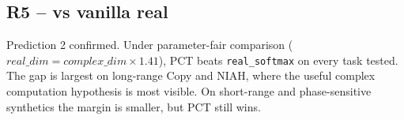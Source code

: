 \documentclass[11pt,a4paper]{article}
\theoremstyle{plain}
\theoremstyle{definition}
\begin{document}
\subsection{R5 -- vs vanilla real}
\noindent
\begin{minipage}[t]{0.47\textwidth}
\vspace{0pt}
\raggedright
\sloppy
Prediction 2 confirmed. Under parameter-fair comparison ($real\_dim = complex\_dim \times 1.41$), PCT beats \texttt{real\_softmax} on every task tested. The gap is largest on long-range Copy and NIAH, where the useful complex computation hypothesis is most visible. On short-range and phase-sensitive synthetics the margin is smaller, but PCT still wins.
\end{minipage}\hfill
\begin{minipage}[t]{0.30\textwidth}
\vspace{0pt}
\centering
{\fontsize{5.6}{6.4}\selectfont
\setlength{\tabcolsep}{1.4pt}
\renewcommand{\arraystretch}{1.05}
}
\captionsetup{skip=2pt}
\end{minipage}
\par\medskip
\end{document}
